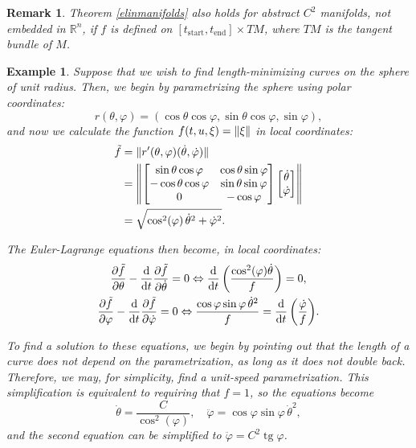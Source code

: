 \documentclass{article}
\theoremstyle{plain}
\newtheorem{remark}{Remark}
\newtheorem{example}{Example}
\theoremstyle{nonumberplain}
\newcommand{\R}{\mathbb{R}}
\newcommand{\tstart}{\mathrm{start}}
\newcommand{\tend}{\mathrm{end}}
\DeclarePairedDelimiter\norm{\lVert}{\rVert}
\DeclareMathOperator{\tg}{tg}
\begin{document}
\begin{remark}
Theorem \ref{elinmanifolds} also holds for abstract $C^2$ manifolds, not embedded in $\R^n$, if $f$ is defined on $[t_\tstart, t_\tend] \times TM$, where $TM$ is the tangent bundle of $M$.
\end{remark}

\begin{example}\label{sphere1}
Suppose that we wish to find length-minimizing curves on the sphere of unit radius. Then, we begin by parametrizing the sphere using polar coordinates:
\[r(\theta, \varphi) = (\cos\theta \cos\varphi, \sin\theta \cos\varphi, \sin\varphi),\]
and now we calculate the function $f(t,u,\xi) = \norm\xi$ in local coordinates:
\begin{align*}
\tilde f &= \norm{r'(\theta, \varphi) (\dot \theta, \dot \varphi)}\\
&= \norm*{\begin{bmatrix}
\sin\theta \cos\varphi & \cos\theta \sin\varphi\\
-\cos\theta \cos\varphi & \sin\theta \sin\varphi\\
0 & -\cos\varphi
\end{bmatrix}
\begin{bmatrix}
\dot\theta\\
\dot\varphi
\end{bmatrix}
}\\
&= \sqrt{\cos^2(\varphi) \, \dot\theta^2 + \dot\varphi^2}.
\end{align*}

The Euler-Lagrange equations then become, in local coordinates:
\begin{gather*}
\diffp{\tilde f} \theta - \diff*{\diffp{\tilde f}{\dot \theta}}t = 0 \Leftrightarrow \diff*{\left( \frac{\cos^2(\varphi) \dot \theta}{f} \right)}t = 0,\\
\diffp{\tilde f} \varphi - \diff*{\diffp{\tilde f}{\dot \varphi}}t = 0
\Leftrightarrow
\frac{\cos\varphi \sin\varphi \,\dot \theta^2}{f} = \diff*{\left( \frac{\dot \varphi}{f} \right)}t.
\end{gather*}

To find a solution to these equations, we begin by pointing out that the length of a curve does not depend on the parametrization, as long as it does not double back. Therefore, we may, for simplicity, find a unit-speed parametrization. This simplification is equivalent to requiring that $f = 1$, so the equations become
\[\dot \theta = \frac C {\cos^2(\varphi)}, \quad \ddot \varphi = \cos\varphi \sin\varphi \, \dot \theta^2,\]
and the second equation can be simplified to $\ddot \varphi = C^2 \tg \varphi$.


\end{example}
\end{document}
